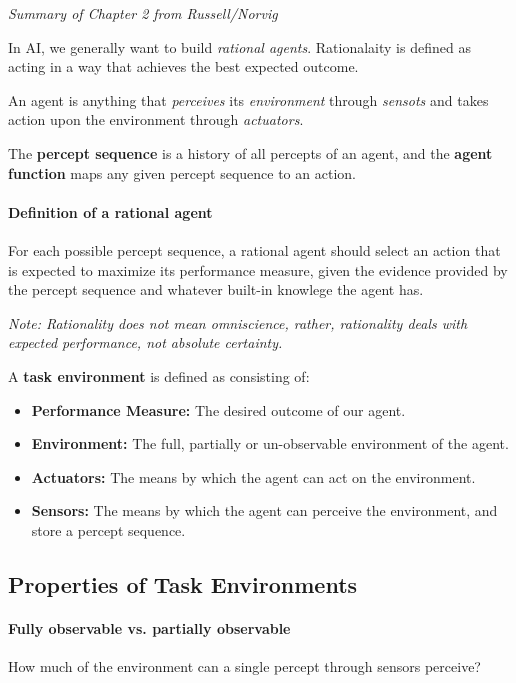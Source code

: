 \textit{Summary of Chapter 2 from Russell/Norvig}

In AI, we generally want to build \textit{rational agents}. Rationalaity is defined as acting in a way that achieves the best expected outcome.

An agent is anything that \textit{perceives} its \textit{environment} through \textit{sensots} and takes action upon the environment through \textit{actuators}.

The \textbf{percept sequence} is a history of all percepts of an agent, and the \textbf{agent function} maps any given percept sequence to an action.

\paragraph{Definition of a rational agent} For each possible percept sequence, a rational agent should select an action that is expected to maximize its performance measure, given the evidence provided by the percept sequence and whatever built-in knowlege the agent has.

\textit{Note: Rationality does not mean omniscience, rather, rationality deals with expected performance, not absolute certainty.}

A \textbf{task environment} is defined as consisting of:

\begin{itemize}
    \item \textbf{Performance Measure:} The desired outcome of our agent.
    \item \textbf{Environment:} The full, partially or un-observable environment of the agent.
    \item \textbf{Actuators:} The means by which the agent can act on the environment.
    \item \textbf{Sensors:} The means by which the agent can perceive the environment, and store a percept sequence.
\end{itemize}

\subsection{Properties of Task Environments}

\paragraph{Fully observable vs. partially observable} How much of the environment can a single percept through sensors perceive?

